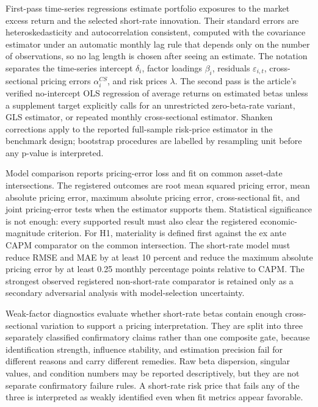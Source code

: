 \documentclass[11pt]{article}
\begin{document}
First-pass time-series regressions estimate portfolio exposures to the market
excess return and the selected short-rate innovation. Their standard errors are
heteroskedasticity and autocorrelation consistent, computed with the
\citet{newey_west_1987} covariance estimator under an automatic monthly lag rule
that depends only on the number of observations, so no lag length is chosen after
seeing an estimate. The notation separates the
time-series intercept \(\delta_i\), factor loadings \(\beta_i\), residuals
\(\varepsilon_{i,t}\), cross-sectional pricing errors \(\alpha^{CS}_i\), and
risk prices \(\lambda\). The second pass is the article's verified no-intercept
OLS regression of average returns on estimated betas unless a supplement target
explicitly calls for an unrestricted zero-beta-rate variant, GLS estimator, or
repeated monthly cross-sectional estimator. Shanken corrections apply to the
reported full-sample risk-price estimator in the benchmark design; bootstrap
procedures are labelled by resampling unit before any p-value is interpreted. %

Model comparison reports pricing-error loss and fit on common asset-date
intersections. The registered outcomes are root mean squared pricing error, mean
absolute pricing error, maximum absolute pricing error, cross-sectional fit, and
joint pricing-error tests when the estimator supports them. Statistical
significance is not enough: every supported result must also clear the registered
economic-magnitude criterion.
For H1, materiality is defined first against the ex ante CAPM comparator on the
common intersection. The short-rate model must reduce RMSE and MAE by at least
10 percent and reduce the maximum absolute pricing error by at least 0.25 %
monthly percentage points relative to CAPM. The strongest observed registered
non-short-rate comparator is retained only as a secondary adversarial analysis
with model-selection uncertainty. %

Weak-factor diagnostics evaluate whether short-rate betas contain enough
cross-sectional variation to support a pricing interpretation. They are split
into three separately classified confirmatory claims rather than one composite
gate, because identification strength, influence stability, and estimation
precision fail for different reasons and carry different remedies. Raw beta
dispersion, singular values, and condition numbers may be reported
descriptively, but they are not separate confirmatory failure rules. A
short-rate risk price that fails any of the three is interpreted as weakly
identified even when fit metrics appear favorable.
\end{document}
